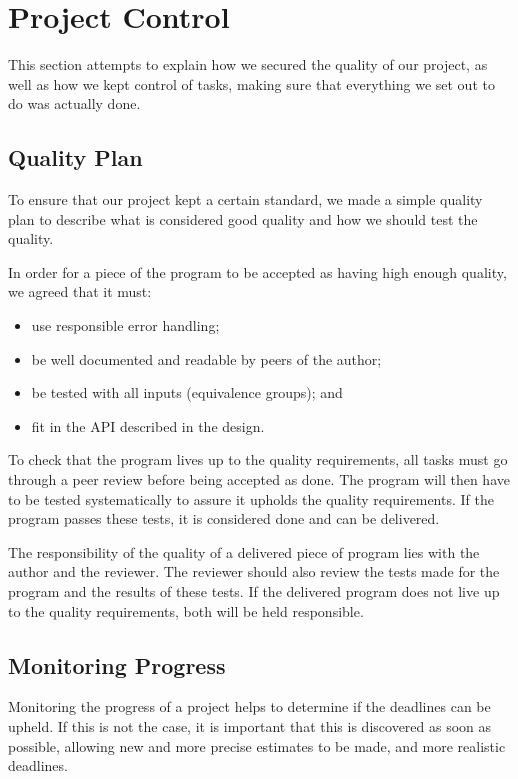 \section{Project Control}
\label{sec:EmpiriControl}
This section attempts to explain how we secured the quality of our project, as well as how we kept control of tasks, making sure that everything we set out to do was actually done.

\subsection{Quality Plan}
\label{sec:EmpiriQualityControl}
To ensure that our project kept a certain standard, we made a simple quality plan\cite[ch.~14.4.2]{caye} to describe what is considered good quality and how we should test the quality.

In order for a piece of the program to be accepted as having high enough quality, we
agreed that it must:

\begin{itemize}
    \item use responsible error handling;
    \item be well documented and readable by peers of the author;
    \item be tested with all inputs (equivalence groups); and
    \item fit in the API described in the design.
\end{itemize}

To check that the program lives up to the quality requirements, all tasks must go through a peer review before being accepted as done. The program will then have to be tested systematically to assure it upholds the quality requirements. If the program passes these tests, it is considered done and can be delivered.

The responsibility of the quality of a delivered piece of program lies with the author
and the reviewer. The reviewer should also review the tests made for the program and
the results of these tests. If the delivered program does not live up to the quality
requirements, both will be held responsible.

\subsection{Monitoring Progress}
\label{sec:EmpiriProgress}

Monitoring the progress of a project helps to determine if the deadlines can be upheld.
If this is not the case, it is important that this is discovered as soon as possible,
allowing new and more precise estimates to be made, and more realistic deadlines.

